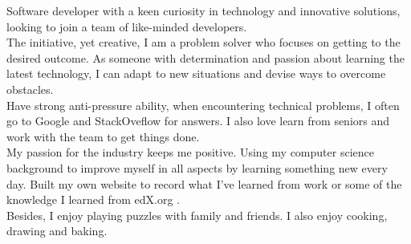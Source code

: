 
\begin{cvparagraph}
\bullet \enskip Software developer with a keen curiosity in technology and innovative solutions, looking to join a team of like-minded developers. \\
\bullet \enskip The initiative, yet creative, I am a problem solver who focuses on getting to the desired outcome.
\bullet \enskip As someone with determination and passion about learning the latest technology, I can adapt to new situations and devise ways to overcome obstacles.\\
\bullet \enskip Have strong anti-pressure ability, when encountering technical problems, I often go to Google and StackOveflow for answers. I also love learn from seniors and work with the team to get things done.\\
\bullet \enskip My passion for the industry keeps me positive. Using my computer science background to improve myself in all aspects by learning something new every day. Built my own website \href{http://chenmu1.com/}{\color{deepblue}{Ethan Mu}} to record what I've learned from work or some of the knowledge I learned from edX.org .\\
\bullet \enskip Besides, I enjoy playing puzzles with family and friends. I also enjoy cooking, drawing and baking. 
\end{cvparagraph}
